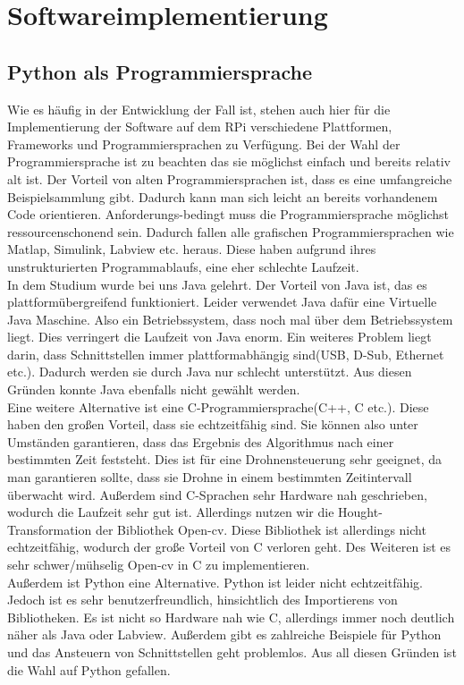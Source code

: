 \chapter{Softwareimplementierung}
\section{Python als Programmiersprache}
Wie es häufig in der Entwicklung der Fall ist, stehen auch hier für die Implementierung
der Software auf dem RPi verschiedene Plattformen, Frameworks und
Programmiersprachen zu Verfügung. Bei der Wahl der Programmiersprache ist zu beachten das sie möglichst einfach und bereits relativ alt ist. Der Vorteil von alten Programmiersprachen ist, dass es eine umfangreiche Beispielsammlung gibt. Dadurch kann man sich leicht an bereits vorhandenem Code orientieren.
Anforderungs-bedingt muss die Programmiersprache möglichst ressourcenschonend sein.
Dadurch fallen alle grafischen Programmiersprachen wie Matlap, Simulink, Labview etc. heraus. Diese haben aufgrund ihres unstrukturierten Programmablaufs, eine eher schlechte Laufzeit.\\ 
In dem Studium wurde bei uns Java gelehrt. Der Vorteil von Java ist, das es plattformübergreifend funktioniert. Leider verwendet Java dafür eine Virtuelle Java Maschine. Also ein Betriebssystem, dass noch mal über dem Betriebssystem liegt. Dies verringert die Laufzeit von Java enorm. Ein weiteres Problem liegt darin, dass Schnittstellen immer plattformabhängig sind(USB, D-Sub, Ethernet etc.). Dadurch werden sie durch Java nur schlecht unterstützt. Aus diesen Gründen konnte Java ebenfalls nicht gewählt werden.\\

Eine weitere Alternative ist eine C-Programmiersprache(C++, C etc.). Diese haben den großen Vorteil, dass sie echtzeitfähig sind. Sie können also unter Umständen garantieren, dass das Ergebnis des Algorithmus nach einer bestimmten Zeit feststeht. Dies ist für eine Drohnensteuerung sehr geeignet, da man garantieren sollte, dass sie Drohne in einem bestimmten Zeitintervall überwacht wird. Außerdem sind C-Sprachen sehr Hardware nah geschrieben, wodurch die Laufzeit sehr gut ist. Allerdings nutzen wir die Hought-Transformation der Bibliothek Open-cv. Diese Bibliothek ist allerdings nicht echtzeitfähig, wodurch der große Vorteil von C verloren geht. Des Weiteren ist es sehr schwer/mühselig Open-cv in C zu implementieren.\\

Außerdem ist Python eine Alternative. Python ist leider nicht echtzeitfähig. Jedoch ist es sehr benutzerfreundlich, hinsichtlich des Importierens von Bibliotheken. Es ist nicht so Hardware nah wie C, allerdings immer noch deutlich näher als Java oder Labview. Außerdem gibt es zahlreiche Beispiele für Python und das Ansteuern von Schnittstellen geht problemlos. Aus all diesen Gründen ist die Wahl auf Python gefallen.
